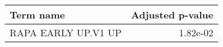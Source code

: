 \begin{tabular}{lr}
\toprule
          Term name &  Adjusted p-value \\
\midrule
RAPA EARLY UP.V1 UP &          1.82e-02 \\
\bottomrule
\end{tabular}
